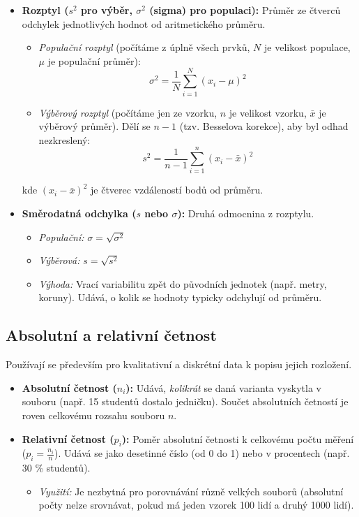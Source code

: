 \begin{itemize}
    \item \textbf{Rozptyl ($s^2$ pro výběr, $\sigma^2$ (sigma) pro populaci):} 
    Průměr ze čtverců odchylek jednotlivých hodnot od aritmetického průměru.
    \begin{itemize}
        \item \textit{Populační rozptyl} (počítáme z úplně všech prvků, $N$ je velikost populace, $\mu$ je populační průměr):
        \[ \sigma^2 = \frac{1}{N} \sum_{i=1}^{N} (x_i - \mu)^2 \]
        \item \textit{Výběrový rozptyl} (počítáme jen ze vzorku, $n$ je velikost vzorku, $\bar{x}$ je výběrový průměr). Dělí se $n-1$ (tzv. Besselova korekce), aby byl odhad nezkreslený:
        \[ s^2 = \frac{1}{n-1} \sum_{i=1}^{n} (x_i - \bar{x})^2 \]
    \end{itemize}

    kde $(x_i - \bar{x})^2$ je čtverec vzdáleností bodů od průměru.
    
    \item \textbf{Směrodatná odchylka ($s$ nebo $\sigma$):} 
    Druhá odmocnina z rozptylu.
    \begin{itemize}
        \item \textit{Populační:} $\sigma = \sqrt{\sigma^2}$
        \item \textit{Výběrová:} $s = \sqrt{s^2}$
        \item \textit{Výhoda:} Vrací variabilitu zpět do původních jednotek (např. metry, koruny). Udává, o kolik se hodnoty typicky odchylují od průměru.
    \end{itemize}
\end{itemize}

\subsection{Absolutní a relativní četnost}
Používají se především pro kvalitativní a diskrétní data k popisu jejich rozložení.

\begin{itemize}
    \item \textbf{Absolutní četnost ($n_i$):} Udává, \textit{kolikrát} se daná varianta vyskytla v souboru (např. 15 studentů dostalo jedničku). Součet absolutních četností je roven celkovému rozsahu souboru $n$.
    \item \textbf{Relativní četnost ($p_i$):} Poměr absolutní četnosti k celkovému počtu měření ($p_i = \frac{n_i}{n}$). 
    Udává se jako desetinné číslo (od 0 do 1) nebo v procentech (např. 30 \% studentů).
    \begin{itemize}
        \item \textit{Využití:} Je nezbytná pro porovnávání různě velkých souborů (absolutní počty nelze srovnávat, pokud má jeden vzorek 100 lidí a druhý 1000 lidí).
    \end{itemize}
\end{itemize}

